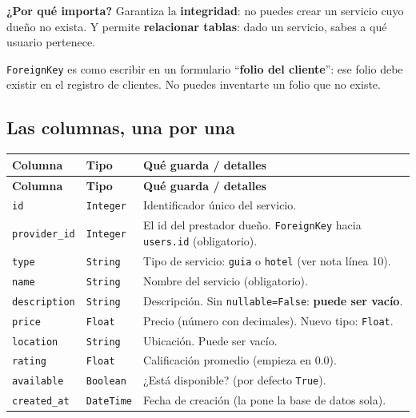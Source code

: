 \documentclass[11pt,a4paper]{article}
\begin{document}
\textbf{¿Por qué importa?} Garantiza la \textbf{integridad}: no puedes crear un servicio cuyo dueño
no exista. Y permite \textbf{relacionar tablas}: dado un servicio, sabes a qué usuario pertenece.

\begin{analogia}
\texttt{ForeignKey} es como escribir en un formulario ``\textbf{folio del cliente}'':
ese folio debe existir en el registro de clientes. No puedes inventarte un folio que no existe.
\end{analogia}

\subsection{Las columnas, una por una}

\begin{center}
{\small
\setlength{\tabcolsep}{4pt}
\begin{longtable}{@{}>{\raggedright\arraybackslash}p{3.4cm}>{\raggedright\arraybackslash}p{3cm}>{\raggedright\arraybackslash}p{8.5cm}@{}}
\toprule
\textbf{Columna} & \textbf{Tipo} & \textbf{Qué guarda / detalles} \\
\midrule
\endfirsthead
\toprule
\textbf{Columna} & \textbf{Tipo} & \textbf{Qué guarda / detalles} \\
\midrule
\endhead
\texttt{id} & \texttt{Integer} & Identificador único del servicio. \\
\texttt{provider\_id} & \texttt{Integer} & El id del prestador dueño. \texttt{ForeignKey} hacia \texttt{users.id} (obligatorio). \\
\texttt{type} & \texttt{String} & Tipo de servicio: \texttt{guia} o \texttt{hotel} (ver nota línea 10). \\
\texttt{name} & \texttt{String} & Nombre del servicio (obligatorio). \\
\texttt{description} & \texttt{String} & Descripción. Sin \texttt{nullable=False}: \textbf{puede ser vacío}. \\
\texttt{price} & \texttt{Float} & Precio (número con decimales). Nuevo tipo: \texttt{Float}. \\
\texttt{location} & \texttt{String} & Ubicación. Puede ser vacío. \\
\texttt{rating} & \texttt{Float} & Calificación promedio (empieza en 0.0). \\
\texttt{available} & \texttt{Boolean} & ¿Está disponible? (por defecto \texttt{True}). \\
\texttt{created\_at} & \texttt{DateTime} & Fecha de creación (la pone la base de datos sola). \\
\bottomrule
\end{longtable}
}
\end{center}
\end{document}

